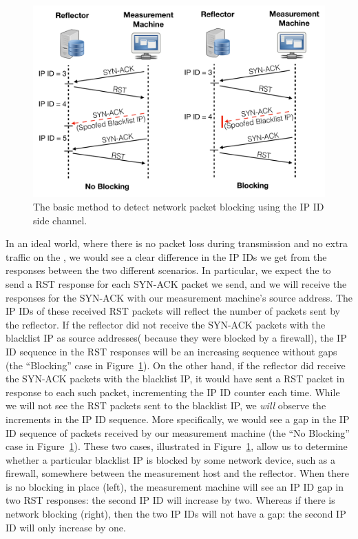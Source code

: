 
\begin{figure}[t]
    \centering
    \includegraphics[width=0.98\columnwidth]{data_usage/images/cropped_method_protocol_v2.pdf}
    \caption{The basic method to detect network packet blocking using the IP ID side channel.}
    \label{fig:coreidea}
\end{figure}

In an ideal world, where there is no packet loss during transmission
and no extra traffic on the {}, we would see a clear difference
in the IP IDs we get from the responses between the two different scenarios.
In particular, we expect the {} to send a RST response for
each SYN-ACK packet we send, and we will receive the responses for
the SYN-ACK with our measurement machine's source address. The IP IDs of these
received RST packets will reflect the number of
packets sent by the reflector. If the reflector did not receive the SYN-ACK
packets with the blacklist IP as source addresses( because they were blocked by a
firewall), the IP ID sequence in the RST responses will be an
increasing sequence without gaps (the ``Blocking'' case in Figure~\ref{fig:coreidea}).
On the other hand, if the reflector did
receive the SYN-ACK packets with the blacklist IP, it would have sent
a RST packet in response to each such packet, incrementing the IP ID counter
each time. While we will not see the RST packets sent to the blacklist
IP, we \emph{will} observe the increments in the IP ID sequence.
More specifically, we would see a gap in the IP ID sequence of packets received
by our measurement machine (the ``No Blocking'' case in
Figure~\ref{fig:coreidea}).
These two cases, illustrated in Figure~\ref{fig:coreidea}, allow us to
determine whether a particular blacklist IP is blocked by some network
device, such as a firewall, somewhere between the measurement host and
the reflector. When there is no blocking in place (left), the measurement
machine will see an IP ID gap in two RST responses: the second IP ID will
increase by two. Whereas if there is network blocking (right), then the
two IP IDs will not have a gap: the second IP ID will only increase by
one.

